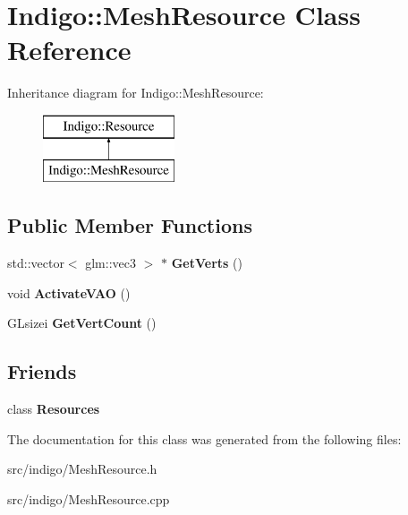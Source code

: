 \hypertarget{class_indigo_1_1_mesh_resource}{}\section{Indigo\+:\+:Mesh\+Resource Class Reference}
\label{class_indigo_1_1_mesh_resource}
Inheritance diagram for Indigo\+:\+:Mesh\+Resource\+:\begin{figure}[H]
\begin{center}
\leavevmode
\includegraphics[height=2.000000cm]{class_indigo_1_1_mesh_resource}
\end{center}
\end{figure}
\subsection*{Public Member Functions}
\begin{DoxyCompactItemize}
\item 
\mbox{\label{class_indigo_1_1_mesh_resource_a20f924a8ad2ae2618e049ad00a46ea30}} 
std\+::vector$<$ glm\+::vec3 $>$ $\ast$ {\bfseries Get\+Verts} ()
\item 
\mbox{\label{class_indigo_1_1_mesh_resource_a5b92559b9deb64d3570446317d1b3374}} 
void {\bfseries Activate\+V\+AO} ()
\item 
\mbox{\label{class_indigo_1_1_mesh_resource_aaf74573609bdf2a0e07cb70c7cd01633}} 
G\+Lsizei {\bfseries Get\+Vert\+Count} ()
\end{DoxyCompactItemize}
\subsection*{Friends}
\begin{DoxyCompactItemize}
\item 
\mbox{\label{class_indigo_1_1_mesh_resource_a74b3f77e4a7285c624d30192f9643876}} 
class {\bfseries Resources}
\end{DoxyCompactItemize}


The documentation for this class was generated from the following files\+:\begin{DoxyCompactItemize}
\item 
src/indigo/Mesh\+Resource.\+h\item 
src/indigo/Mesh\+Resource.\+cpp\end{DoxyCompactItemize}
